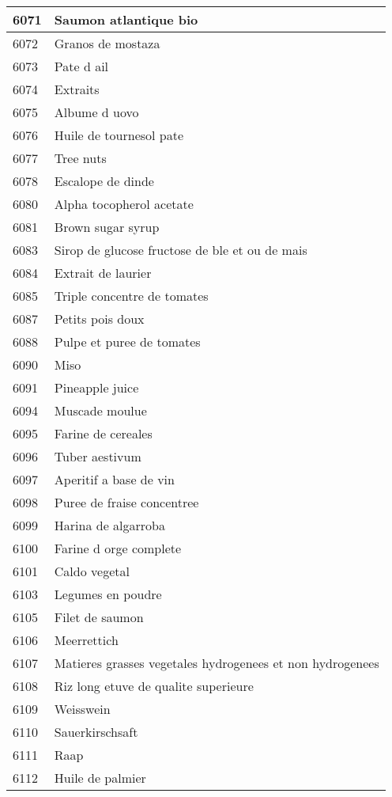 \begin{longtable}{|l|l|}
6071 & Saumon atlantique bio \\ \hline 
6072 & Granos de mostaza \\ \hline 
6073 & Pate d ail \\ \hline 
6074 & Extraits \\ \hline 
6075 & Albume d uovo \\ \hline 
6076 & Huile de tournesol pate \\ \hline 
6077 & Tree nuts \\ \hline 
6078 & Escalope de dinde \\ \hline 
6080 & Alpha tocopherol acetate \\ \hline 
6081 & Brown sugar syrup \\ \hline 
6083 & Sirop de glucose fructose de ble et ou de mais \\ \hline 
6084 & Extrait de laurier \\ \hline 
6085 & Triple concentre de tomates \\ \hline 
6087 & Petits pois doux \\ \hline 
6088 & Pulpe et puree de tomates \\ \hline 
6090 & Miso \\ \hline 
6091 & Pineapple juice \\ \hline 
6094 & Muscade moulue \\ \hline 
6095 & Farine de cereales \\ \hline 
6096 & Tuber aestivum \\ \hline 
6097 & Aperitif a base de vin \\ \hline 
6098 & Puree de fraise concentree \\ \hline 
6099 & Harina de algarroba \\ \hline 
6100 & Farine d orge complete \\ \hline 
6101 & Caldo vegetal \\ \hline 
6103 & Legumes en poudre \\ \hline 
6105 & Filet de saumon \\ \hline 
6106 & Meerrettich \\ \hline 
6107 & Matieres grasses vegetales hydrogenees et non hydrogenees \\ \hline 
6108 & Riz long etuve de qualite superieure \\ \hline 
6109 & Weisswein \\ \hline 
6110 & Sauerkirschsaft \\ \hline 
6111 & Raap \\ \hline 
6112 & Huile de palmier \\ \hline 

\end{longtable}
